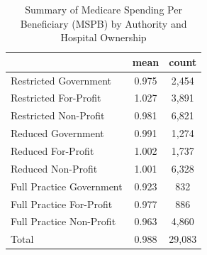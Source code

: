 \begin{table}[htbp]\centering
\def\sym#1{\ifmmode^{#1}\else\(^{#1}\)\fi}
\caption{Summary of Medicare Spending Per Beneficiary (MSPB) by Authority and Hospital Ownership}
\begin{tabular}{l*{1}{cc}}
\toprule
                    &        mean&       count\\
\midrule
Restricted Government&       0.975&       2,454\\
Restricted For-Profit&       1.027&       3,891\\
Restricted Non-Profit&       0.981&       6,821\\
Reduced Government  &       0.991&       1,274\\
Reduced For-Profit  &       1.002&       1,737\\
Reduced Non-Profit  &       1.001&       6,328\\
Full Practice Government&       0.923&         832\\
Full Practice For-Profit&       0.977&         886\\
Full Practice Non-Profit&       0.963&       4,860\\
Total               &       0.988&      29,083\\
\bottomrule
\end{tabular}
\end{table}
